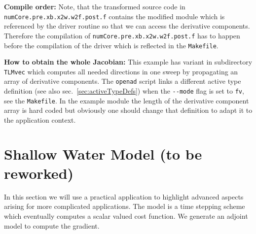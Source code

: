 \documentclass{book}
\newcommand{\refsec}[1]{{sec.~\ref{#1}}}
\begin{document}
\noindent
{\bf Compile order:} Note, that the transformed source code in \lstinline{numCore.pre.xb.x2w.w2f.post.f} 
contains the modified module which is referenced by the driver routine so that we can access the derivative
components. Therefore the compilation of \lstinline{numCore.pre.xb.x2w.w2f.post.f} has to happen before 
the compilation of the driver which is reflected in the \lstinline{Makefile}.

\noindent
{\bf How to obtain the whole Jacobian:} This example has variant in subdirectory \lstinline{TLMvec} which 
computes all needed directions in one sweep by propagating an array of derivative components.  
The \lstinline{openad} script links a different active type definition (see also \refsec{sec:activeTypeDefs})
when the \lstinline{--mode} flag is set to \lstinline{fv}, see the \lstinline{Makefile}.
In the example module the length of the derivative component array is hard coded but obviously one should  
change that definition to adapt it to the application context. 

\section{Shallow Water Model (to be reworked)}\label{sec:shallow}
In this section we will use a practical application to highlight 
advanced aspects arising for more complicated applications. 
The model is a time stepping scheme which eventually computes 
a scalar valued cost function. We generate an adjoint model 
to compute the gradient.  

\end{document}
